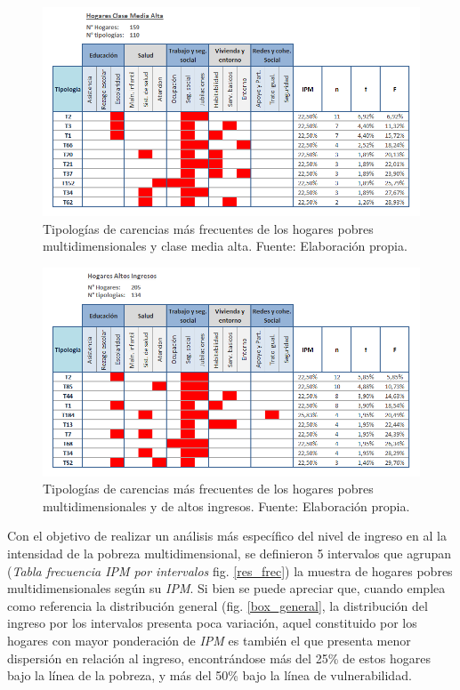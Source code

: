 \documentclass[12pt,letterpaper,spanish]{article}
\begin{document}
\begin{figure}[H]
    \centering
    \includegraphics[width=\textwidth]{Max/tipol_CMA.png}
    \caption{Tipologías de carencias más frecuentes de los hogares pobres multidimensionales y clase media alta. Fuente: Elaboración propia.}
    \label{TipCMA}
\end{figure}

\begin{figure}[H]
    \centering
    \includegraphics[width=\textwidth]{Max/tipol_AI.png}
    \caption{Tipologías de carencias más frecuentes de los hogares pobres multidimensionales y de altos ingresos. Fuente: Elaboración propia.}
    \label{TipAI}
\end{figure}









Con el objetivo de realizar un análisis más específico del nivel de ingreso en al la intensidad de la pobreza multidimensional, se definieron 5 intervalos que agrupan  (\textit{Tabla frecuencia IPM por intervalos} fig. \ref{res_frec}) la muestra de hogares pobres multidimensionales según su \textit{IPM}. Si bien se puede apreciar que, cuando emplea como referencia la distribución general (fig. \ref{box_general}, la distribución del ingreso por los intervalos presenta poca variación,  aquel constituido por los hogares con mayor ponderación de \textit{IPM}  es también el que presenta menor dispersión en relación al ingreso, encontrándose más del 25\% de estos hogares bajo la línea de la pobreza, y más del 50\% bajo la línea de vulnerabilidad. 
\end{document}
